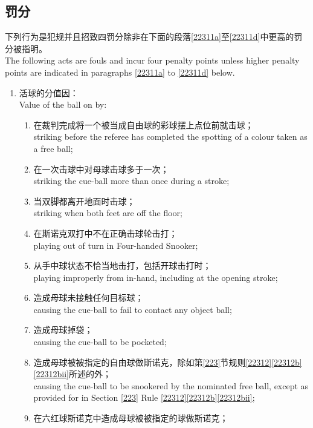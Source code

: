 \subsection{罚分}\label{22311}

\noindent 下列行为是犯规并且招致四罚分除非在下面的段落\ref{22311a}至\ref{22311d}中更高的罚分被指明。\\
The following acts are fouls and incur four penalty points unless higher penalty points are indicated in paragraphs \ref{22311a} to \ref{22311d} below.
\begin{enumerate}[label=(\alph*),start=1]
    \item \label{22311a}活球的分值因：\\
    Value of the ball on by:
    \begin{enumerate}[label=(\roman*)]
        \item \label{22311ai}在裁判完成将一个被当成自由球的彩球摆上点位前就击球；\\
        striking before the referee has completed the spotting of a colour taken as a free ball;
        \item 在一次击球中对母球击球多于一次；\\
        striking the cue-ball more than once during a stroke;
        \item \label{22311aiii}当双脚都离开地面时击球；\\
        striking when both feet are off the floor;
        \item 在斯诺克双打中不在正确击球轮击打；\\
        playing out of turn in Four-handed Snooker;
        \item 从手中球状态不恰当地击打，包括开球击打时；\\
        playing improperly from in-hand, including at the opening stroke;
        \item 造成母球未接触任何目标球；\\
        causing the cue-ball to fail to contact any object ball;
        \item 造成母球掉袋；\\
        causing the cue-ball to be pocketed;
        \item 造成母球被被指定的自由球做斯诺克，除如第\ref{223}节规则\ref{22312}\ref{22312b}\ref{22312bii}所述的外；\\
        causing the cue-ball to be snookered by the nominated free ball, except as provided for in Section \ref{223} Rule \ref{22312}\ref{22312b}\ref{22312bii};
        \item 在六红球斯诺克中造成母球被被指定的球做斯诺克；\\

\end{enumerate}
\end{enumerate}
